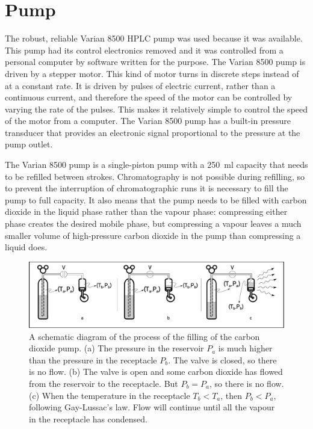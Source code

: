 \section{Pump}
\label{sec:CO2Pump}

The robust, reliable Varian 8500 HPLC pump was used because it was available.
This pump had its control electronics removed and it was controlled from a
personal computer by software written for the purpose. The Varian 8500 pump is
driven by a stepper motor. This kind of motor turns in discrete steps instead of
at a constant rate. It is driven by pulses of electric current, rather than a
continuous current, and therefore the speed of the motor can be controlled by
varying the rate of the pulses. This makes it relatively simple to control the
speed of the motor from a computer. The Varian 8500 pump has a built-in pressure
transducer that provides an electronic signal proportional to the pressure at
the pump outlet.

The Varian 8500 pump is a single-piston pump with a \SI{250}{\milli\litre}
capacity that needs to be refilled between strokes. Chromatography is not
possible during refilling, so to prevent the interruption of chromatographic
runs it is necessary to fill the pump to full capacity. It also means that the
pump needs to be filled with carbon dioxide in the liquid phase rather than the
vapour phase: compressing either phase creates the desired mobile phase,
but compressing a vapour leaves a much smaller volume of high-pressure carbon
dioxide in the pump than compressing a liquid does.
 
\begin{figure}
\centering
\includegraphics[width=\textwidth]{Figures/CO2Filling.pdf}
\decoRule

\caption[Filling a CO\textsubscript{2} pump.]{A schematic diagram of the process
of the filling of the carbon dioxide pump. (a) The pressure in the reservoir
\(P_a\) is much higher than the pressure in the receptacle \(P_b\). The valve is
closed, so there is no flow. (b) The valve is open and some carbon dioxide has
flowed from the reservoir to the receptacle. But \(P_b = P_a\), so there is no
flow. (c) When the temperature in the receptacle \(T_b < T_a\), then \(P_b  < P_a\),
following Gay-Lussac's law. Flow will continue until all the vapour in the
receptacle has condensed.}

\label{fig:co2fill}
\end{figure}


